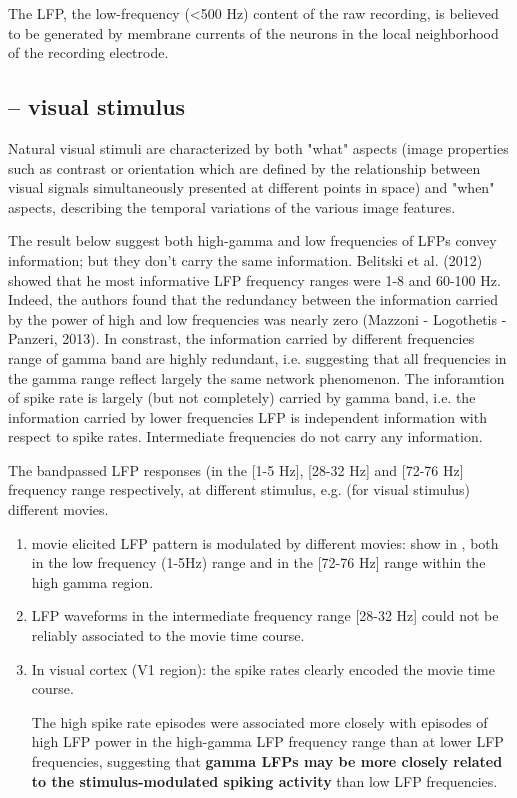 The LFP, the low-frequency (<500 Hz) content of the raw recording, is believed
to be generated by membrane currents of the neurons in the local neighborhood of
the recording electrode. 

\subsection{-- visual stimulus}

Natural visual stimuli are characterized by both "what" aspects (image
properties such as contrast or orientation which are defined by the relationship
between visual signals simultaneously presented at different points in space)
and "when" aspects, describing the temporal variations of the various image
features.

The result below suggest both high-gamma and low frequencies of LFPs convey
information; but they don't carry the same information.
Belitski et al. (2012) showed that he most informative LFP frequency ranges were
1-8 and 60-100 Hz. Indeed, the authors found that the redundancy between the
information carried by the power of high and low frequencies was nearly zero
(Mazzoni - Logothetis - Panzeri, 2013). In constrast, the information carried by
different frequencies range of gamma band are highly redundant, i.e.
suggesting that all frequencies in the gamma range reflect largely the same
network phenomenon. The inforamtion of spike rate is largely (but not
completely) carried by gamma band, i.e. the information carried by lower
frequencies LFP is independent information with respect to spike rates.
Intermediate frequencies do not carry any information.

The bandpassed LFP responses (in the [1-5 Hz], [28-32 Hz] and [72-76 Hz]
frequency range respectively, at different stimulus, e.g. (for visual stimulus)
different movies.
\begin{enumerate}
  \item movie elicited LFP pattern is modulated by different movies: 
  show in , both in the low frequency (1-5Hz) range and in the [72-76 Hz]
range within the high gamma region.

  \item LFP waveforms in the intermediate frequency range [28-32 Hz] could not
  be reliably associated to the movie time course.
  
  
  \item In visual cortex (V1 region): the spike rates clearly
encoded the movie time course.

The high spike rate episodes were associated more closely with episodes of high
LFP power in the high-gamma LFP frequency range than at lower LFP frequencies,
suggesting that {\bf gamma LFPs may be more closely related to the
stimulus-modulated spiking activity} than low LFP frequencies.

\end{enumerate}

